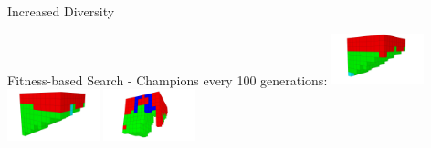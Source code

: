 \documentclass[6pt]{beamer}
\begin{document}
{\begin{frame}{Increased Diversity}
\begin{block}{Fitness-based Search - Champions every 100 generations:}
\includegraphics[width=0.2\textwidth]{../Figures/Robots/f_4_g_800.jpg}
\includegraphics[width=0.2\textwidth]{../Figures/Robots/f_4_g_900.jpg}
\includegraphics[width=0.2\textwidth]{../Figures/Robots/f_4_g_1000.jpg}
\end{block}
\end{frame}

}
\end{document}
